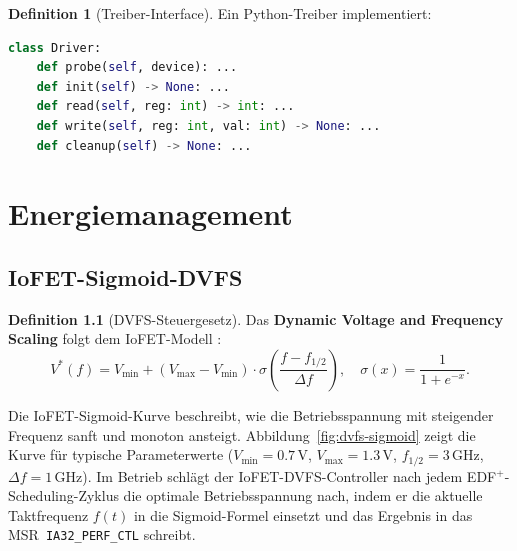 ﻿\documentclass[a4paper,12pt]{scrreprt}
\theoremstyle{definition}
\newtheorem{definition}{Definition}[chapter]
\begin{document}
	\begin{definition}[Treiber-Interface]
		Ein Python-Treiber implementiert:
		\begin{lstlisting}[language=Python]
class Driver:
	def probe(self, device): ...
	def init(self) -> None: ...
	def read(self, reg: int) -> int: ...
	def write(self, reg: int, val: int) -> None: ...
	def cleanup(self) -> None: ...
		\end{lstlisting}
	\end{definition}
	
	\chapter{Energiemanagement}
	
	\section{IoFET-Sigmoid-DVFS}

	\begin{definition}[DVFS-Steuergesetz]
		Das \textbf{Dynamic Voltage and Frequency Scaling} folgt dem
		IoFET-Modell \cite{Epp2026iono}:
		\[
		V^*(f) = V_{\min} + (V_{\max} - V_{\min}) \cdot
		\sigma\!\left(\frac{f - f_{1/2}}{\Delta f}\right),
		\quad
		\sigma(x) = \frac{1}{1 + e^{-x}}.
		\]
	\end{definition}

	Die IoFET-Sigmoid-Kurve beschreibt, wie die Betriebsspannung mit
	steigender Frequenz sanft und monoton ansteigt. Abbildung~\ref{fig:dvfs-sigmoid}
	zeigt die Kurve für typische Parameterwerte ($V_{\min} = 0.7\,\text{V}$,
	$V_{\max} = 1.3\,\text{V}$, $f_{1/2} = 3\,\text{GHz}$, $\Delta f = 1\,\text{GHz}$).
	Im Betrieb schlägt der IoFET-DVFS-Controller nach jedem EDF$^+$-Scheduling-Zyklus
	die optimale Betriebsspannung nach, indem er die aktuelle Taktfrequenz $f(t)$
	in die Sigmoid-Formel einsetzt und das Ergebnis in das MSR~\texttt{IA32\_PERF\_CTL}
	schreibt.
\end{document}
